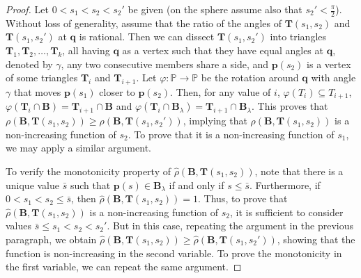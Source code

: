\documentclass[10pt,a4paper]{amsart}
\newcommand{\BB}{\mathbf{B}}
\newcommand{\PPP}{\mathbb{P}}
\newcommand{\TT}{\mathbf{T}}
\newcommand{\p}{\mathbf{p}}
\newcommand{\q}{\mathbf{q}}
\begin{document}
\begin{proof}
Let $0  < s_1 < s_2 < s_2'$ be given (on the sphere assume also that $s_2' < \frac{\pi}{2}$). Without loss of generality, assume that the ratio of the angles of $\TT(s_1,s_2)$ and $\TT(s_1,s_2')$ at $\q$ is rational. Then we can dissect $\TT(s_1,s_2')$ into triangles $\TT_1, \TT_2, \ldots, \TT_k$, all having $\q$ as a vertex such that they have equal angles at $\q$, denoted by $\gamma$, any two consecutive members share a side, and $\p(s_2)$ is a vertex of some triangles $\TT_i$ and $\TT_{i+1}$. Let $\varphi : \PPP \to \PPP$ be the rotation around $\q$ with angle $\gamma$ that moves $\p(s_1)$ closer to $\p(s_2)$. Then, for any value of $i$, $\varphi(T_i) \subseteq T_{i+1}$, $\varphi(\TT_i \cap \BB) = \TT_{i+1} \cap \BB$ and $\varphi(\TT_i \cap \BB_{\lambda}) = \TT_{i+1} \cap \BB_{\lambda}$.
This proves that $\rho(\BB,\TT(s_1,s_2)) \geq \rho(\BB,\TT(s_1,s_2'))$, implying that $\rho(\BB,\TT(s_1,s_2))$ is a non-increasing function of $s_2$. To prove that it is a non-increasing function of $s_1$, we may apply a similar argument.

To verify the monotonicity property of $\hat{\rho}(\BB,\TT(s_1,s_2))$, note that there is a unique value $\bar{s}$ such that $\p(s) \in \BB_{\lambda}$ if and only if $s \leq \bar{s}$. Furthermore, if $0 < s_1 < s_2 \leq \bar{s}$, then $\hat{\rho}  (\BB,\TT(s_1,s_2)) =1$. Thus, to prove that $\hat{\rho}(\BB,\TT(s_1,s_2))$ is a non-increasing function of $s_2$, it is sufficient to consider values $\bar{s} \leq s_1 < s_2 < s_2'$. But in this case, repeating the argument in the previous paragraph, we obtain
$\hat{\rho}(\BB,\TT(s_1,s_2)) \geq \hat{\rho}(\BB,\TT(s_1,s_2'))$, showing that the function is non-increasing in the second variable. To prove the monotonicity in the first variable, we can repeat the same argument.
\end{proof}
\end{document}
